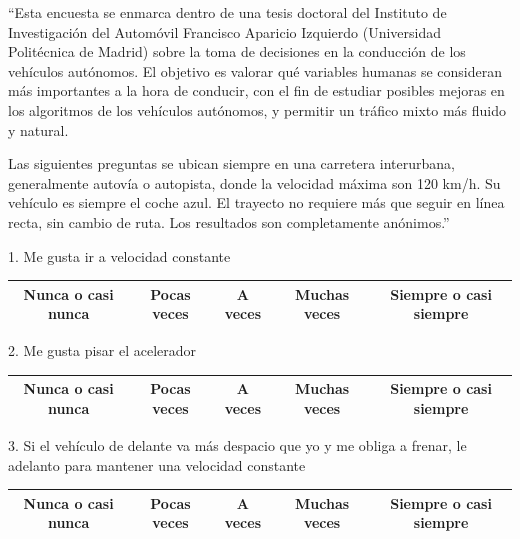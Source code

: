 ``Esta encuesta se enmarca dentro de una tesis doctoral del Instituto de Investigación del Automóvil Francisco Aparicio Izquierdo (Universidad Politécnica de Madrid) sobre la toma de decisiones en la conducción de los vehículos autónomos. El objetivo es valorar qué variables humanas se consideran más importantes a la hora de conducir, con el fin de estudiar posibles mejoras en los algoritmos de los vehículos autónomos, y permitir un tráfico mixto más fluido y natural.

Las siguientes preguntas se ubican siempre en una carretera interurbana, generalmente autovía o autopista, donde la velocidad máxima son 120 km/h. Su vehículo es siempre el coche azul. El trayecto no requiere más que seguir en línea recta, sin cambio de ruta. 
Los resultados son completamente anónimos.''


1. Me gusta ir a velocidad constante
\vspace{-10pt}
\begin{table}[h]
\centering
\begin{tabular}{|c|c|c|c|c|}
\hline
Nunca o casi nunca & Pocas veces & A veces & Muchas veces & Siempre o casi siempre \\ \hline
\end{tabular}
\end{table}

2. Me gusta pisar el acelerador 
\vspace{-10pt}
\begin{table}[h]
\centering
\begin{tabular}{|c|c|c|c|c|}
\hline
Nunca o casi nunca & Pocas veces & A veces & Muchas veces & Siempre o casi siempre \\ \hline
\end{tabular}
\end{table}

3. Si el vehículo de delante va más despacio que yo y me obliga a frenar, le adelanto para mantener una velocidad constante  
\vspace{-10pt}
\begin{table}[h]
\centering
\begin{tabular}{|c|c|c|c|c|}
\hline
Nunca o casi nunca & Pocas veces & A veces & Muchas veces & Siempre o casi siempre \\ \hline
\end{tabular}
\end{table}
\newpage

